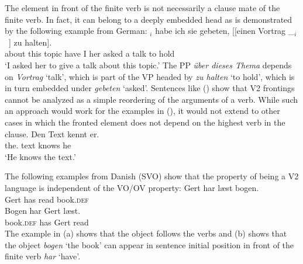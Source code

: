 \zl
\eal
{}
\zl
\eal
{}
\zl
The element in front of the finite verb is not necessarily a clause mate of the finite verb. In
fact, it can belong to a deeply embedded head as is demonstrated by the following example from
German:
\ea
{}$_i$ habe ich sie gebeten, [[einen Vortrag \_$_i$~] zu halten].\footnotemark\\
     \spacebr{}about this topic  have I her asked \hphantom{[[}a talk {} to hold\\\german
{}
\glt `I asked her to give a talk about this topic.'
\z
The PP \emph{über dieses Thema} depends on \emph{Vortrag} `talk', which is part of the VP headed by
\emph{zu halten} `to hold', which is in turn embedded under \emph{gebeten} `asked'. Sentences like
() show that V2 frontings cannot be analyzed as a simple reordering of the arguments of a
verb. While such an approach would work for the examples in (), it would not extend to other
cases in which the fronted element does not depend on the highest verb in the clause.
\ea
\gll Den Text kennt er.\\
     the.\ACC{} text knows he\\
\glt `He knows the text.'
\z

\noindent
The following examples from Danish (SVO) show that the property of being a V2
language is independent of the VO/OV property:
\eal
\ex 
\gll Gert har læst bogen.\\
     Gert has read book.\textsc{def}\\\danish
\ex
\gll Bogen har Gert læst.\\
     book.\textsc{def} has Gert read\\
\zl
The example in (a) shows that the object follows the verbs and (b) shows that the
object \emph{bogen} `the book' can appear in sentence initial position in front of the finite verb
\emph{har} `have'.

